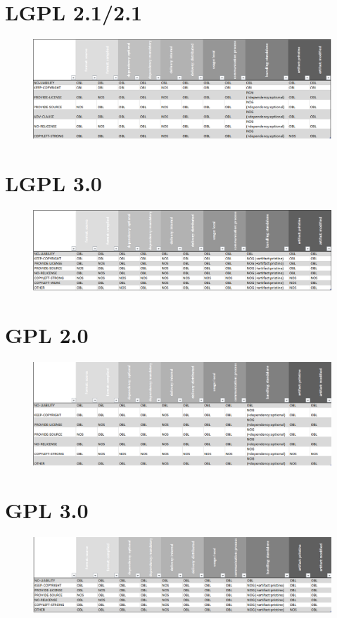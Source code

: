 \documentclass[12pt,titlepage]{report}
\begin{document}
\section*{LGPL 2.1/2.1}
\begin{figure}[h]
    \centering
    \includegraphics[scale=0.5]{Bilder/LGPL2.021.png}
\end{figure}

\section*{LGPL 3.0}
\begin{figure}[h]
    \centering
    \includegraphics[scale=0.5]{Bilder/LGPL3.png}
\end{figure}

\section*{GPL 2.0}
\begin{figure}[h]
    \centering
    \includegraphics[scale=0.5]{Bilder/gpl2.png}
\end{figure}

\section*{GPL 3.0}
\begin{figure}[h]
    \centering
    \includegraphics[scale=0.5]{Bilder/gpl3.png}
\end{figure}
\end{document}
